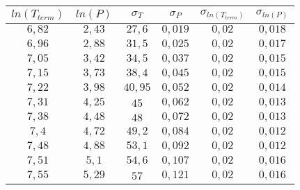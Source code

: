 \begin{tabular}{| c | c | c | c | c | c |}
\hline
$ln(T_{term})$ & $ln(P)$ & $\sigma_T$ & $\sigma_P$ & $\sigma_{ln(T_{term})}$ & $\sigma_{ln(P)}$\\
\hline
$6,82$ & $2,43$ & $27,6$ & $0,019$ & $0,02$ & $0,018$\\
\hline
$6,96$ & $2,88$ & $31,5$ & $0,025$ & $0,02$ & $0,017$\\
\hline
$7,05$ & $3,42$ & $34,5$ & $0,037$ & $0,02$ & $0,015$\\
\hline
$7,15$ & $3,73$ & $38,4$ & $0,045$ & $0,02$ & $0,015$\\
\hline
$7,22$ & $3,98$ & $40,95$ & $0,052$ & $0,02$ & $0,014$\\
\hline
$7,31$ & $4,25$ & $45$ & $0,062$ & $0,02$ & $0,013$\\
\hline
$7,38$ & $4,48$ & $48$ & $0,072$ & $0,02$ & $0,013$\\
\hline
$7,4$ & $4,72$ & $49,2$ & $0,084$ & $0,02$ & $0,012$\\
\hline
$7,48$ & $4,88$ & $53,1$ & $0,092$ & $0,02$ & $0,012$\\
\hline
$7,51$ & $5,1$ & $54,6$ & $0,107$ & $0,02$ & $0,016$\\
\hline
$7,55$ & $5,29$ & $57$ & $0,121$ & $0,02$ & $0,016$\\
\hline
\end{tabular}
